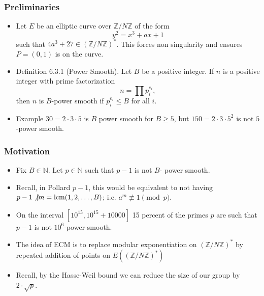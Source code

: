 \documentclass{beamer}
\begin{document}
\begin{frame}
\frametitle{Preliminaries}
\pause
\begin{itemize}
\item<2-> Let $E$ be an elliptic curve over $\mathbb{Z}/N\mathbb{Z}$ of the form
$$
	y^2 = x^3 + ax + 1
$$
such that $4a^3 + 27 \in \left(\mathbb{Z}/N\mathbb{Z}\right)^*$. This forces non singularity and ensures $P = (0,1)$ is on the curve.

\item<3-> Definition 6.3.1 (Power Smooth). Let $B$ be a positive integer. If $n$ is a positive integer with prime factorization
$$
    n = \prod p_i^{e_i},
$$
then $n$ is $B$-power smooth if $p_i^{e_i} \leq B$ for all $i$.

\item<4-> Example $30 = 2\cdot 3\cdot 5$ is $B$ power smooth for $B \geq 5$, but $150 = 2\cdot 3 \cdot 5^2$ is not $5$-power smooth.
\end{itemize}
\end{frame}

\begin{frame}
\frametitle{Motivation}
\pause
\begin{itemize}
\item<2-> Fix $B \in \mathbb{N}$. Let $p \in \mathbb{N}$ such that $p-1$ is not $B$- power smooth.

\item<3-> Recall, in Pollard $p-1$, this would be equivalent to not having $p-1 \not \vert m = \text{lcm}(1,2, \ldots, B)$; i.e. $a^m \not \equiv 1 \pmod{p}$.

\item<4-> On the interval $[10^{15}, 10^{15} + 10000]$ 15 percent of the primes $p$ are such that $p-1$ is not $10^{6}$-power smooth.

\item<5-> The idea of ECM is to replace modular exponentiation on $\left(\mathbb{Z}/N\mathbb{Z}\right)^*$ by repeated addition of points on $E\left(\left(\mathbb{Z}/N\mathbb{Z}\right)^*\right)$

\item<6-> Recall, by the Hasse-Weil bound we can reduce the size of our group by $2\cdot \sqrt{p}$.
\end{itemize}
\end{frame}
\end{document}

